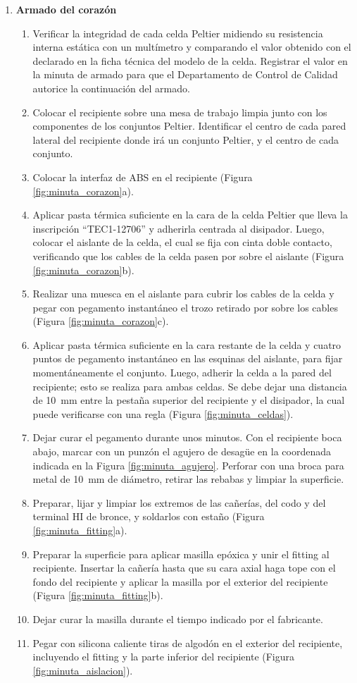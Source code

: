 \documentclass[12pt, a4paper]{article}
\begin{document}
\begin{enumerate}
    \item \textbf{Armado del corazón}
    \begin{enumerate}[label=\alph*.]
        \item Verificar la integridad de cada celda Peltier midiendo su resistencia interna estática con un multímetro y comparando el valor obtenido con el declarado en la ficha técnica del modelo de la celda. Registrar el valor en la minuta de armado para que el Departamento de Control de Calidad autorice la continuación del armado.
        \item Colocar el recipiente sobre una mesa de trabajo limpia junto con los componentes de los conjuntos Peltier. Identificar el centro de cada pared lateral del recipiente donde irá un conjunto Peltier, y el centro de cada conjunto.
        \item Colocar la interfaz de ABS en el recipiente (Figura \ref{fig:minuta_corazon}a).
        \item Aplicar pasta térmica suficiente en la cara de la celda Peltier que lleva la inscripción ``TEC1-12706'' y adherirla centrada al disipador. Luego, colocar el aislante de la celda, el cual se fija con cinta doble contacto, verificando que los cables de la celda pasen por sobre el aislante (Figura \ref{fig:minuta_corazon}b).
        \item Realizar una muesca en el aislante para cubrir los cables de la celda y pegar con pegamento instantáneo el trozo retirado por sobre los cables (Figura \ref{fig:minuta_corazon}c).
        \item Aplicar pasta térmica suficiente en la cara restante de la celda y cuatro puntos de pegamento instantáneo en las esquinas del aislante, para fijar momentáneamente el conjunto. Luego, adherir la celda a la pared del recipiente; esto se realiza para ambas celdas. Se debe dejar una distancia de \SI{10}{\mm} entre la pestaña superior del recipiente y el disipador, la cual puede verificarse con una regla (Figura \ref{fig:minuta_celdas}).
        \item Dejar curar el pegamento durante unos minutos. Con el recipiente boca abajo, marcar con un punzón el agujero de desagüe en la coordenada indicada en la Figura \ref{fig:minuta_agujero}. Perforar con una broca para metal de \SI{10}{\mm} de diámetro, retirar las rebabas y limpiar la superficie.
        \item Preparar, lijar y limpiar los extremos de las cañerías, del codo y del terminal HI de bronce, y soldarlos con estaño (Figura \ref{fig:minuta_fitting}a).
        \item Preparar la superficie para aplicar masilla epóxica y unir el fitting al recipiente. Insertar la cañería hasta que su cara axial haga tope con el fondo del recipiente y aplicar la masilla por el exterior del recipiente (Figura \ref{fig:minuta_fitting}b).
        \item Dejar curar la masilla durante el tiempo indicado por el fabricante.
        \item Pegar con silicona caliente tiras de algodón en el exterior del recipiente, incluyendo el fitting y la parte inferior del recipiente (Figura \ref{fig:minuta_aislacion}).
    \end{enumerate}


\end{enumerate}
\end{document}
